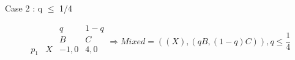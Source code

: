 \begin{enumerate}
\begin{latin}
\begin{center}
               \end{center}
               Case 2 : q $\leq$ 1/4 \\
               \begin{center}
                \begin{equation*}
                            \begin{matrix}
                                  &  & q & 1-q \\
                                  &  & B & C \\
                                 p_1 & X & -1,0 & 4,0 \\
                                \end{matrix} \Longrightarrow Mixed = ((X),(qB,(1-q)C)) , q \leq \frac{1}{4}
                            \end{equation*}
                       \end{center}
    \end{latin}
\end{enumerate}





